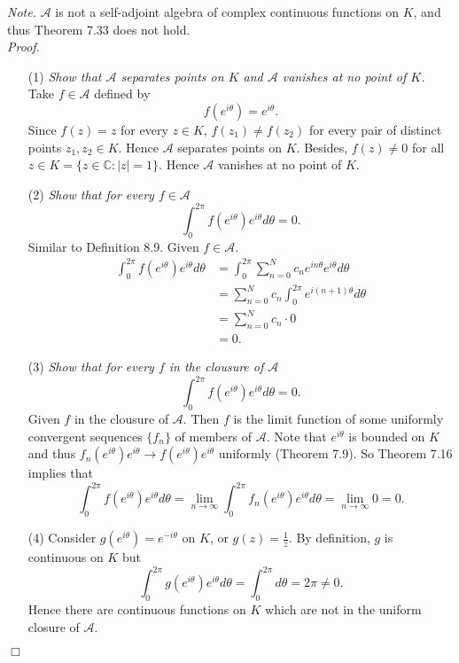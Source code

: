 \documentclass{article}
\begin{document}
\emph{Note.}
$\mathscr{A}$ is not a self-adjoint algebra of complex continuous functions
on $K$, and thus Theorem 7.33 does not hold. \\

\emph{Proof.}
\begin{enumerate}
\item[(1)]
  \emph{Show that $\mathscr{A}$ separates points on $K$ and
  $\mathscr{A}$ vanishes at no point of $K$.}
  Take $f \in \mathscr{A}$ defined by
  \[
    f(e^{i\theta}) = e^{i\theta}.
  \]
  Since $f(z) = z$ for every $z \in K$,
  $f(z_1) \neq f(z_2)$ for every pair of distinct points $z_1, z_2 \in K$.
  Hence $\mathscr{A}$ separates points on $K$.
  Besides, $f(z) \neq 0$ for all $z \in K = \{ z \in \mathbb{C} : |z|=1 \}$.
  Hence $\mathscr{A}$ vanishes at no point of $K$.

\item[(2)]
  \emph{Show that for every $f \in \mathscr{A}$}
  \[
    \int_{0}^{2\pi} f(e^{i\theta})e^{i\theta}d\theta = 0.
  \]
  Similar to Definition 8.9. Given $f \in \mathscr{A}$.
  \begin{align*}
    \int_{0}^{2\pi} f(e^{i\theta})e^{i\theta}d\theta
    &= \int_{0}^{2\pi} \sum_{n=0}^{N} c_n e^{in\theta}e^{i\theta}d\theta \\
    &= \sum_{n=0}^{N} c_n \int_{0}^{2\pi} e^{i(n+1)\theta} d\theta \\
    &= \sum_{n=0}^{N} c_n \cdot 0 \\
    &= 0.
  \end{align*}

\item[(3)]
  \emph{Show that for every $f$ in the clousure of $\mathscr{A}$}
  \[
    \int_{0}^{2\pi} f(e^{i\theta})e^{i\theta}d\theta = 0.
  \]
  Given $f$ in the clousure of $\mathscr{A}$.
  Then $f$ is the limit function of some uniformly convergent sequences $\{f_n\}$
  of members of $\mathscr{A}$.
  Note that $e^{i\theta}$ is bounded on $K$
  and thus $f_n(e^{i\theta})e^{i\theta} \to f(e^{i\theta})e^{i\theta}$ uniformly (Theorem 7.9).
  So Theorem 7.16 implies that
  \[
    \int_{0}^{2\pi} f(e^{i\theta})e^{i\theta}d\theta
    = \lim_{n \to \infty} \int_{0}^{2\pi} f_n(e^{i\theta})e^{i\theta}d\theta
    = \lim_{n \to \infty} 0
    = 0.
  \]

\item[(4)]
  Consider $g(e^{i\theta}) = e^{-i\theta}$ on $K$, or $g(z) = \frac{1}{z}$.
  By definition, $g$ is continuous on $K$ but
  \[
    \int_{0}^{2\pi} g(e^{i\theta})e^{i\theta}d\theta
    = \int_{0}^{2\pi} d\theta
    = 2\pi
    \neq 0.
  \]
  Hence there are continuous functions on $K$ which
  are not in the uniform closure of $\mathscr{A}$.
\end{enumerate}
$\Box$ \\\\
\end{document}
